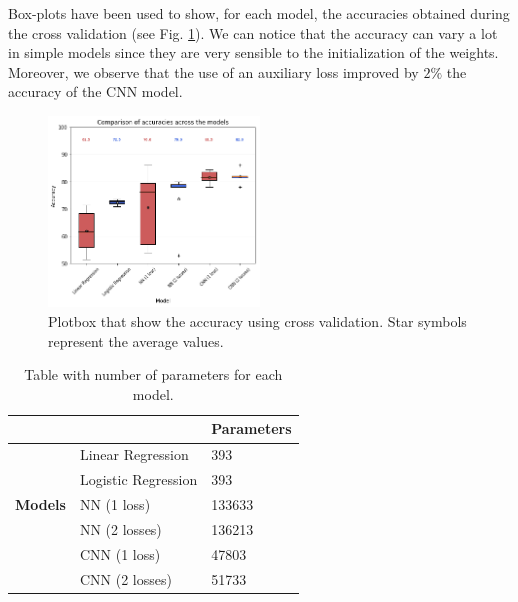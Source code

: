 \documentclass[journal, a4paper]{IEEEtran}
\begin{document}
Box-plots have been used to show, for each model, the accuracies obtained during the cross validation (see Fig. \ref{fig:train_acc_box}). We can notice that the accuracy can vary a lot in simple models since they are very sensible to the initialization of the weights.
Moreover, we observe that the use of an auxiliary loss improved by $2\%$ the accuracy of the CNN model.

\begin{figure}[!h]
    \centering
    \includegraphics[width=0.5\textwidth]{boxplot.png}
    \caption{Plotbox that show the accuracy using cross validation. Star symbols represent the average values.}
    \label{fig:train_acc_box}
\end{figure}

\begin{table}
\centering
\caption{Table with number of parameters for each model.}
\label{table:params}
\begin{tabular}{|l|l|l|} 
\cline{3-3}
\multicolumn{1}{l}{} &                     & \textbf{Parameters}  \\ 
\cline{3-3}
\hline
                     & Linear Regression  & 393     \\ 
\cline{2-3}
               & Logistic Regression & 393     \\ 
\cline{2-3}
 \textbf{Models}   & NN (1 loss)~        & 133633  \\ 
\cline{2-3}
                     & NN (2 losses)~      &  136213  \\ 
\cline{2-3}
                     & CNN (1 loss)~       & 47803   \\ 
\cline{2-3}
                     & CNN (2 losses)     & 51733   \\
\hline
\end{tabular}
\end{table}
\end{document}
